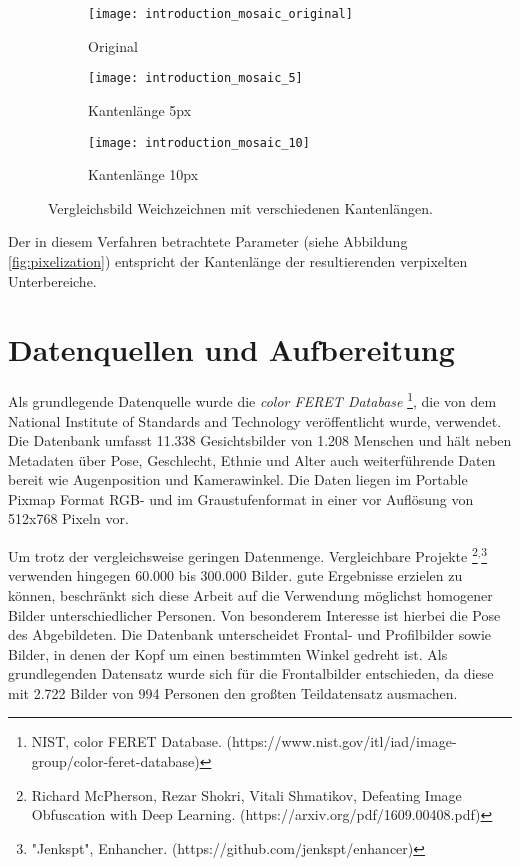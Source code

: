 \documentclass[
12pt, %
a4paper, %
oneside, %
headinclude,footinclude, %
BCOR5mm, %
german]{scrartcl}
\begin{document}
\begin{figure}[h]
    \centering
    \begin{subfigure}{0.3\textwidth}
        \texttt{[image: introduction\_mosaic\_original]}
        \caption{Original}
    \end{subfigure}
    \begin{subfigure}{0.3\textwidth}
        \texttt{[image: introduction\_mosaic\_5]}
        \caption{Kantenlänge 5px}
    \end{subfigure}
    \begin{subfigure}{0.3\textwidth}
        \texttt{[image: introduction\_mosaic\_10]}
        \caption{Kantenlänge 10px}
    \end{subfigure}

    \caption{Vergleichsbild Weichzeichnen mit verschiedenen Kantenlängen.}
    \label{fig:pixelization}
\end{figure}

Der in diesem Verfahren betrachtete Parameter (siehe Abbildung  \vref*{fig:pixelization}) entspricht der Kantenlänge der
resultierenden verpixelten Unterbereiche.


\section{Datenquellen und Aufbereitung}

Als grundlegende Datenquelle wurde die
\textit{color FERET Database} \footnote{NIST, color FERET Database. (https://www.nist.gov/itl/iad/image-group/color-feret-database)},
die von dem National Institute of Standards and Technology veröffentlicht wurde, verwendet.
Die Datenbank umfasst 11.338 Gesichtsbilder von 1.208 Menschen und
hält neben Metadaten über Pose, Geschlecht, Ethnie und Alter auch weiterführende Daten bereit wie Augenposition und
Kamerawinkel. Die Daten liegen im Portable Pixmap Format RGB- und im Graustufenformat in einer vor Auflösung von 512x768 Pixeln vor.

Um trotz der vergleichsweise geringen Datenmenge. Vergleichbare Projekte
\footnote{Richard McPherson, Rezar Shokri, Vitali Shmatikov, Defeating Image Obfuscation with Deep Learning. (https://arxiv.org/pdf/1609.00408.pdf)}$^{,}$\footnote{"Jenkspt", Enhancher. (https://github.com/jenkspt/enhancer)}
verwenden hingegen 60.000 bis 300.000 Bilder.
gute Ergebnisse erzielen zu können, beschränkt sich diese Arbeit auf
die Verwendung möglichst homogener Bilder unterschiedlicher Personen. Von besonderem Interesse ist hierbei die Pose des
Abgebildeten. Die Datenbank unterscheidet Frontal- und Profilbilder sowie Bilder, in denen der Kopf um einen bestimmten
Winkel gedreht ist. Als grundlegenden Datensatz wurde sich für die Frontalbilder entschieden, da diese mit 2.722 Bilder
von 994 Personen den großten Teildatensatz ausmachen.
\end{document}
